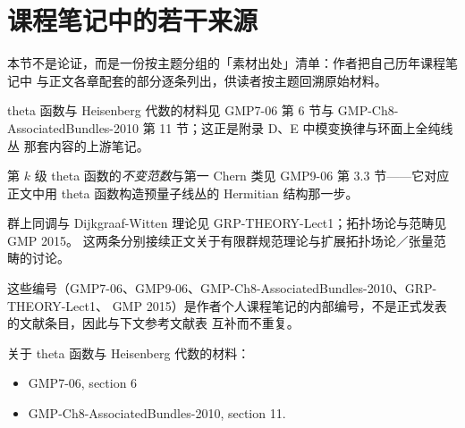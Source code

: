 
\section{课程笔记中的若干来源} %

\begin{keytakeaways}
  \item 本节不是论证，而是一份按主题分组的「素材出处」清单：作者把自己历年课程笔记中
    与正文各章配套的部分逐条列出，供读者按主题回溯原始材料。
  \item theta 函数与 Heisenberg 代数的材料见 GMP7-06 第 6 节与
    GMP-Ch8-AssociatedBundles-2010 第 11 节；这正是附录 D、E 中模变换律与环面上全纯线丛
    那套内容的上游笔记。
  \item 第 $k$ 级 theta 函数的\emph{不变范数}与第一 Chern 类见 GMP9-06 第 3.3 节——它对应
    正文中用 theta 函数构造预量子线丛的 Hermitian 结构那一步。
  \item 群上同调与 Dijkgraaf-Witten 理论见 GRP-THEORY-Lect1；拓扑场论与范畴见 GMP 2015。
    这两条分别接续正文关于有限群规范理论与扩展拓扑场论／张量范畴的讨论。
  \item 这些编号（GMP7-06、GMP9-06、GMP-Ch8-AssociatedBundles-2010、GRP-THEORY-Lect1、
    GMP 2015）是作者个人课程笔记的内部编号，不是正式发表的文献条目，因此与下文参考文献表
    互补而不重复。
\end{keytakeaways}

关于 theta 函数与 Heisenberg 代数的材料：
\begin{itemize}[label={},leftmargin=2.6em,itemsep=2pt,topsep=2pt]
  \item GMP7-06, section 6
  \item GMP-Ch8-AssociatedBundles-2010, section 11.
\end{itemize}

